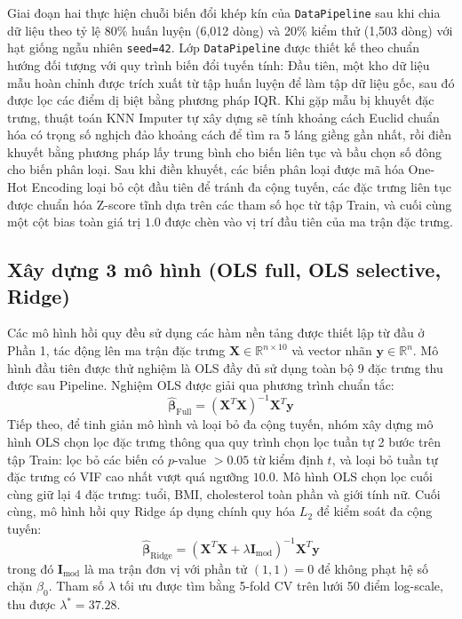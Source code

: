 \documentclass[12pt,a4paper]{article}
\begin{document}
Giai đoạn hai thực hiện chuỗi biến đổi khép kín của \texttt{DataPipeline} sau khi chia dữ liệu theo tỷ lệ 80\% huấn luyện (6,012 dòng) và 20\% kiểm thử (1,503 dòng) với hạt giống ngẫu nhiên \texttt{seed=42}. Lớp \texttt{DataPipeline} được thiết kế theo chuẩn hướng đối tượng với quy trình biến đổi tuyến tính:
Đầu tiên, một kho dữ liệu mẫu hoàn chỉnh được trích xuất từ tập huấn luyện để làm tập dữ liệu gốc, sau đó được lọc các điểm dị biệt bằng phương pháp IQR. Khi gặp mẫu bị khuyết đặc trưng, thuật toán KNN Imputer tự xây dựng sẽ tính khoảng cách Euclid chuẩn hóa có trọng số nghịch đảo khoảng cách để tìm ra 5 láng giềng gần nhất, rồi điền khuyết bằng phương pháp lấy trung bình cho biến liên tục và bầu chọn số đông cho biến phân loại. Sau khi điền khuyết, các biến phân loại được mã hóa One-Hot Encoding loại bỏ cột đầu tiên để tránh đa cộng tuyến, các đặc trưng liên tục được chuẩn hóa Z-score tĩnh dựa trên các tham số học từ tập Train, và cuối cùng một cột bias toàn giá trị $1.0$ được chèn vào vị trí đầu tiên của ma trận đặc trưng.

\subsection{Xây dựng 3 mô hình (OLS full, OLS selective, Ridge)}
Các mô hình hồi quy đều sử dụng các hàm nền tảng được thiết lập từ đầu ở Phần 1, tác động lên ma trận đặc trưng $\mathbf{X} \in \mathbb{R}^{n \times 10}$ và vector nhãn $\mathbf{y} \in \mathbb{R}^n$. Mô hình đầu tiên được thử nghiệm là OLS đầy đủ sử dụng toàn bộ 9 đặc trưng thu được sau Pipeline. Nghiệm OLS được giải qua phương trình chuẩn tắc:
\begin{equation}
\hat{\boldsymbol{\beta}}_{\text{Full}} = (\mathbf{X}^T \mathbf{X})^{-1} \mathbf{X}^T \mathbf{y}
\end{equation}
Tiếp theo, để tinh giản mô hình và loại bỏ đa cộng tuyến, nhóm xây dựng mô hình OLS chọn lọc đặc trưng thông qua quy trình chọn lọc tuần tự 2 bước trên tập Train: lọc bỏ các biến có $p$-value $> 0.05$ từ kiểm định $t$, và loại bỏ tuần tự đặc trưng có VIF cao nhất vượt quá ngưỡng $10.0$. Mô hình OLS chọn lọc cuối cùng giữ lại 4 đặc trưng: tuổi, BMI, cholesterol toàn phần và giới tính nữ. Cuối cùng, mô hình hồi quy Ridge áp dụng chính quy hóa $L_2$ để kiểm soát đa cộng tuyến:
\begin{equation}
\hat{\boldsymbol{\beta}}_{\text{Ridge}} = (\mathbf{X}^T \mathbf{X} + \lambda \mathbf{I}_{\text{mod}})^{-1} \mathbf{X}^T \mathbf{y}
\end{equation}
trong đó $\mathbf{I}_{\text{mod}}$ là ma trận đơn vị với phần tử $(1,1) = 0$ để không phạt hệ số chặn $\beta_0$. Tham số $\lambda$ tối ưu được tìm bằng 5-fold CV trên lưới 50 điểm log-scale, thu được $\lambda^* = 37.28$.
\end{document}
